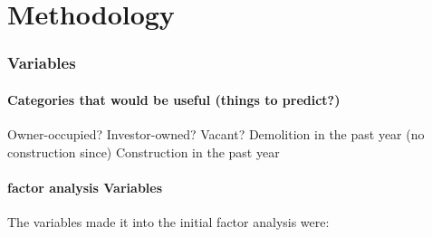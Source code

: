 \documentclass[
]{book}
\theoremstyle{definition}
\theoremstyle{definition}
\theoremstyle{definition}
\theoremstyle{definition}
\theoremstyle{remark}
\begin{document}
\hypertarget{methodology}{%
\chapter{Methodology}\label{methodology}}

\hypertarget{variables}{%
\subsection{Variables}\label{variables}}

\hypertarget{categories-that-would-be-useful-things-to-predict}{%
\subsubsection{Categories that would be useful (things to predict?)}\label{categories-that-would-be-useful-things-to-predict}}

Owner-occupied?
Investor-owned?
Vacant?
Demolition in the past year (no construction since)
Construction in the past year

\hypertarget{factor-analysis-variables}{%
\subsubsection{factor analysis Variables}\label{factor-analysis-variables}}

The variables made it into the initial factor analysis were:
\end{document}
